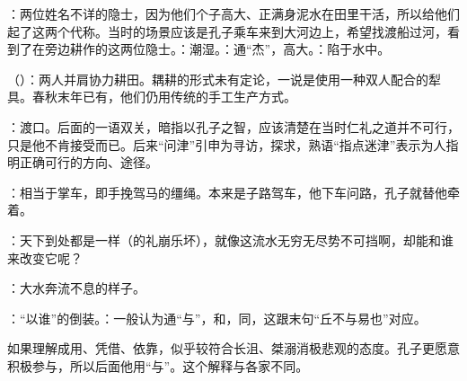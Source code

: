 {
\item {}：两位姓名不详的隐士，因为他们个子高大、正满身泥水在田里干活，所以给他们起了这两个代称。当时的场景应该是孔子乘车来到大河边上，希望找渡船过河，看到了在旁边耕作的这两位隐士。：潮湿。：通“杰”，高大。：陷于水中。

\item {}（）：两人并肩协力耕田。耦耕的形式未有定论，一说是使用一种双人配合的犁具。春秋末年已有，他们仍用传统的手工生产方式。

\item {}：渡口。后面的一语双关，暗指以孔子之智，应该清楚在当时仁礼之道并不可行，只是他不肯接受而已。后来“问津”引申为寻访，探求，熟语“指点迷津”表示为人指明正确可行的方向、途径。

\item {}：相当于掌车，即手挽驾马的缰绳。本来是子路驾车，他下车问路，孔子就替他牵着。

\item {}：天下到处都是一样（的礼崩乐坏），就像这流水无穷无尽势不可挡啊，却能和谁来改变它呢？

：大水奔流不息的样子。

：“以谁”的倒装。：一般认为通“与”，和，同，这跟末句“丘不与易也”对应。

如果理解成用、凭借、依靠，似乎较符合长沮、桀溺消极悲观的态度。孔子更愿意积极参与，所以后面他用“与”。这个解释与各家不同。

}
